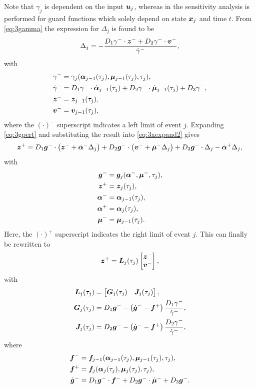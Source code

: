 \documentclass[../DC2017114Bouma.tex]{subfiles}
\begin{document}
Note that $\gamma_j$ is dependent on the input ${\boldsymbol{u}}_j$, whereas in \cite{Chen2018a} the sensitivity analysis is performed for guard functions which solely depend on state ${\boldsymbol{x}}_j$ and time $t$. From \eqref{eq:3gamma} the expression for $\Delta_{j}$ is found to be
\begin{align}
\Delta_{j} = -\frac{D_1\gamma^{-}\cdot{\boldsymbol{z}}^- + D_2\gamma^{-}\cdot{\boldsymbol{v}}^-}{\dot{\gamma}^{-}},\label{eq:3Deltaj}
\end{align}
with
\begin{align*}
\gamma^- &= \gamma_j(\boldsymbol{\alpha}_{j-1}(\tau_j),\boldsymbol{\mu}_{j-1}(\tau_j),\tau_j),\\
\dot{\gamma}^- &= D_1\gamma^-\cdot\dot{\boldsymbol{\alpha}}_{j-1}(\tau_j) + D_2\gamma^-\cdot\dot{\boldsymbol{\mu}}_{j-1}(\tau_j) + D_3\gamma^-,\\
{\boldsymbol{z}}^- &= {\boldsymbol{z}}_{j-1}(\tau_j),\\
{\boldsymbol{v}}^- &= {\boldsymbol{v}}_{j-1}(\tau_j),
\end{align*}
where the $(\cdot)^-$ superscript indicates a left limit of event $j$. Expanding \eqref{eq:3gpert} and substituting the result into \eqref{eq:3xexpand2} gives
\begin{equation}
{\boldsymbol{z}}^+ = D_1{\boldsymbol{g}}^-\cdot\left({\boldsymbol{z}}^- + \dot{\boldsymbol{\alpha}}^-\Delta_j\right) + D_2{\boldsymbol{g}}^-\cdot\left({\boldsymbol{v}}^- + \dot{\boldsymbol{\mu}}^-\Delta_j\right) + D_3{\boldsymbol{g}}^-\cdot\Delta_j - \dot{\boldsymbol{\alpha}}^+\Delta_j,
\end{equation}
with
\begin{align*}
{\boldsymbol{g}}^- &= {\boldsymbol{g}}_j(\boldsymbol{\alpha}^-,\boldsymbol{\mu}^-,\tau_j),\\
{\boldsymbol{z}}^+ &= {\boldsymbol{z}}_j(\tau_j),\\
\boldsymbol{\alpha}^- &= \boldsymbol{\alpha}_{j-1}(\tau_j),\\
\boldsymbol{\alpha}^+ &= \boldsymbol{\alpha}_j(\tau_j),\\
\boldsymbol{\mu}^- &= \boldsymbol{\mu}_{j-1}(\tau_j).
\end{align*}
Here, the $(\cdot)^+$ superscript indicates the right limit of event $j$. This can finally be rewritten to
\begin{align}
{\boldsymbol{z}}^+ = {\boldsymbol{L}}_j(\tau_j)\begin{bmatrix}
{\boldsymbol{z}}^- \\ {\boldsymbol{v}}^-
\end{bmatrix},
\end{align}
with 
\begin{align*}
{\boldsymbol{L}}_j(\tau_j) &= \begin{bmatrix}
{\boldsymbol{G}}_j(\tau_j) & {\boldsymbol{J}}_j(\tau_j)
\end{bmatrix},\\
{\boldsymbol{G}}_j(\tau_j) & = D_1{\boldsymbol{g}}^- - \left(\dot{{\boldsymbol{g}}}^- - {\boldsymbol{f}}^+\right)\frac{D_1\gamma^-}{\dot{\gamma}^-},\\
{\boldsymbol{J}}_j(\tau_j) & = D_2{\boldsymbol{g}}^- - \left(\dot{{\boldsymbol{g}}}^- - {\boldsymbol{f}}^+\right)\frac{D_2\gamma^-}{\dot{\gamma}^-},
\end{align*}
where
\begin{align*}
{\boldsymbol{f}}^- &= {\boldsymbol{f}}_{j-1}(\boldsymbol{\alpha}_{j-1}(\tau_j),\boldsymbol{\mu}_{j-1}(\tau_j),\tau_j),\\
{\boldsymbol{f}}^+ &= {\boldsymbol{f}}_j(\boldsymbol{\alpha}_j(\tau_j),\boldsymbol{\mu}_j(\tau_j),\tau_j),\\
\dot{{\boldsymbol{g}}}^- &= D_1{\boldsymbol{g}}^-\cdot {\boldsymbol{f}}^- + D_2{\boldsymbol{g}}^-\cdot \dot{\boldsymbol{\mu}}^- + D_3{\boldsymbol{g}}^-.
\end{align*}
\end{document}
